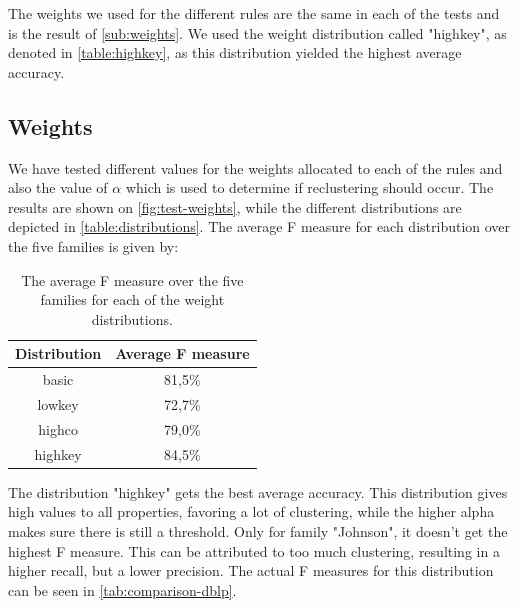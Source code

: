 The weights we used for the different rules are the same in each of the tests and is the result of \autoref{sub:weights}. We used the weight distribution called "highkey", as denoted in \autoref{table:highkey}, as this distribution yielded the highest average accuracy.



\subsection{Weights}
\label{sub:weights}

We have tested different values for the weights allocated to each of the rules and also the value of $\alpha$ which is used to determine if reclustering should occur. The results are shown on \autoref{fig:test-weights}, while the different distributions are depicted in \autoref{table:distributions}. The average F measure for each distribution over the five families is given by:

\begin{table}[ht]
	\center
	\begin{tabular}{|c|c|}
		\hline
		\bfseries{Distribution} & \bfseries{Average F measure} \\
		\hline
		basic & 81,5\% \\
		\hline
		lowkey & 72,7\% \\
		\hline
		highco & 79,0\% \\
		\hline
		highkey & 84,5\% \\
		\hline
	\end{tabular}
	\caption{The average F measure over the five families for each of the weight distributions.}
	\label{table:avg-f-distr}
\end{table}

The distribution "highkey" gets the best average accuracy. This distribution gives high values to all properties, favoring a lot of clustering, while the higher alpha makes sure there is still a threshold. Only for family "Johnson", it doesn't get the highest F measure. This can be attributed to too much clustering, resulting in a higher recall, but a lower precision. The actual F measures for this distribution can be seen in \autoref{tab:comparison-dblp}.

